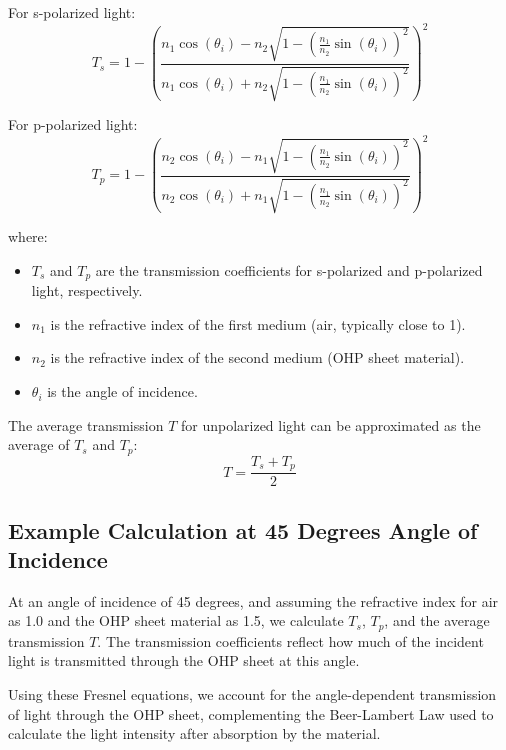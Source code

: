 For s-polarized light:
\[ T_s = 1 - \left( \frac{n_1 \cos(\theta_i) - n_2 \sqrt{1 - \left(\frac{n_1}{n_2} \sin(\theta_i)\right)^2}}{n_1 \cos(\theta_i) + n_2 \sqrt{1 - \left(\frac{n_1}{n_2} \sin(\theta_i)\right)^2}} \right)^2 \]

For p-polarized light:
\[ T_p = 1 - \left( \frac{n_2 \cos(\theta_i) - n_1 \sqrt{1 - \left(\frac{n_1}{n_2} \sin(\theta_i)\right)^2}}{n_2 \cos(\theta_i) + n_1 \sqrt{1 - \left(\frac{n_1}{n_2} \sin(\theta_i)\right)^2}} \right)^2 \]

where:
\begin{itemize}
    \item \( T_s \) and \( T_p \) are the transmission coefficients for s-polarized and p-polarized light, respectively.
    \item \( n_1 \) is the refractive index of the first medium (air, typically close to 1).
    \item \( n_2 \) is the refractive index of the second medium (OHP sheet material).
    \item \( \theta_i \) is the angle of incidence.
\end{itemize}

The average transmission \( T \) for unpolarized light can be approximated as the average of \( T_s \) and \( T_p \):
\[ T = \frac{T_s + T_p}{2} \]

\subsection*{Example Calculation at 45 Degrees Angle of Incidence}
At an angle of incidence of 45 degrees, and assuming the refractive index for air as 1.0 and the OHP sheet material as 1.5, we calculate \( T_s \), \( T_p \), and the average transmission \( T \). The transmission coefficients reflect how much of the incident light is transmitted through the OHP sheet at this angle.

Using these Fresnel equations, we account for the angle-dependent transmission of light through the OHP sheet, complementing the Beer-Lambert Law used to calculate the light intensity after absorption by the material.


